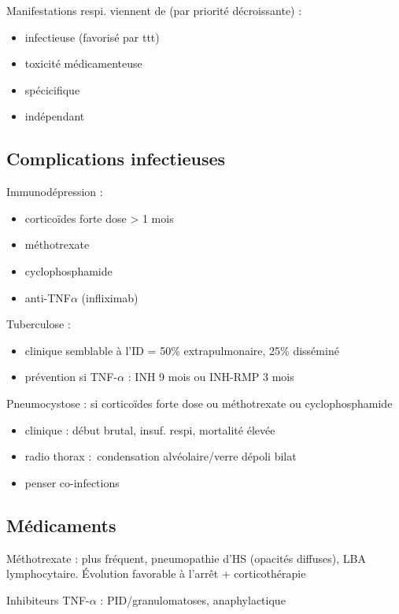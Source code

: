 Manifestations respi. viennent de (par priorité décroissante) :
\begin{itemize}
\item infectieuse (favorisé par ttt)
\item toxicité médicamenteuse
\item spécicifique
\item indépendant
\end{itemize}

\subsection{Complications infectieuses}
Immunodépression :
\begin{itemize}
\item corticoïdes forte dose > 1 mois
\item méthotrexate
\item cyclophosphamide
\item anti-TNF$\alpha$ (infliximab)
\end{itemize}
Tuberculose : 
\begin{itemize}
\item clinique semblable à l'ID = 50\% extrapulmonaire, 25\% disséminé
\item prévention si TNF-$\alpha$ : INH 9 mois ou INH-RMP 3 mois
\end{itemize}
Pneumocystose : si corticoïdes forte dose ou méthotrexate ou
cyclophosphamide
\begin{itemize}
\item clinique : début brutal, insuf. respi, mortalité élevée
\item radio thorax : condensation alvéolaire/verre dépoli bilat
\item penser co-infections
\end{itemize}
\subsection{Médicaments}
Méthotrexate : plus fréquent, pneumopathie d'HS (opacités diffuses), \gls{LBA}
lymphocytaire. Évolution favorable à l'arrêt + corticothérapie

Inhibiteurs TNF-$\alpha$ : PID/granulomatoses, anaphylactique

